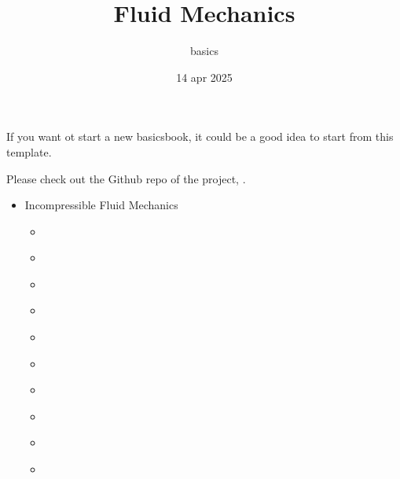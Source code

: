 \documentclass[letterpaper,10pt,italian]{jupyterBook}
\title{Fluid Mechanics}
\date{14 apr 2025}
\author{basics}
\begin{document}
\pagestyle{empty}
\sphinxmaketitle
\pagestyle{plain}
\sphinxtableofcontents
\pagestyle{normal}
\label{\detokenize{intro::doc}}


\sphinxAtStartPar
If you want ot start a new basics\sphinxhyphen{}book, it could be a good idea to start from this template.

\sphinxAtStartPar
Please check out the Github repo of the project, .
\begin{itemize}
\item {} 
\sphinxAtStartPar
Incompressible Fluid Mechanics

\begin{itemize}
\item {} 
\sphinxAtStartPar
{\hyperref[\detokenize{polimi/fluidmechanics-ita/template/capitoli/01_statica/02teoria::doc}]{}}

\item {} 
\sphinxAtStartPar
{\hyperref[\detokenize{polimi/fluidmechanics-ita/template/capitoli/02_tensSup/03teoria::doc}]{}}

\item {} 
\sphinxAtStartPar
{\hyperref[\detokenize{polimi/fluidmechanics-ita/template/capitoli/03_cinematica/12teoria::doc}]{}}

\item {} 
\sphinxAtStartPar
{\hyperref[\detokenize{polimi/fluidmechanics-ita/template/capitoli/04_bilanci/04teoria::doc}]{}}

\item {} 
\sphinxAtStartPar
{\hyperref[\detokenize{polimi/fluidmechanics-ita/template/capitoli/05_bernoulli/05teoria::doc}]{}}

\item {} 
\sphinxAtStartPar
{\hyperref[\detokenize{polimi/fluidmechanics-ita/template/capitoli/06_slnEsatte/0600in::doc}]{}}

\item {} 
\sphinxAtStartPar
{\hyperref[\detokenize{polimi/fluidmechanics-ita/template/capitoli/07_similitudine/07teoria::doc}]{}}

\item {} 
\sphinxAtStartPar
{\hyperref[\detokenize{polimi/fluidmechanics-ita/template/capitoli/08_aerodinamica/08teoria::doc}]{}}

\item {} 
\sphinxAtStartPar
{\hyperref[\detokenize{polimi/fluidmechanics-ita/template/capitoli/09_bl/09teoria::doc}]{}}

\item {} 
\sphinxAtStartPar
{\hyperref[\detokenize{polimi/fluidmechanics-ita/template/capitoli/10_turbolenza/10teoria::doc}]{}}

\end{itemize}
\end{itemize}
\end{document}

